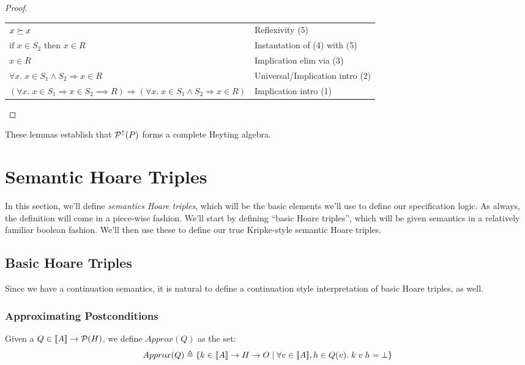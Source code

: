 \begin{proof}
\begin{tabular}{ll}
$x \succeq x$ & 
Reflexivity (5) \\

$\mbox{if } x \in S_2 \mbox{ then } x \in R$ & 
Instantation of (4) with (5) \\

$x \in R$ & 
Implication elim via (3) \\

$\forall x.\; x \in S_1 \land S_2 \Rightarrow x \in R$ & 
Universal/Implication intro (2) \\

$(\forall x.\; x \in S_1 \Rightarrow x \in S_2 \implies R) \Rightarrow (\forall x.\; x \in S_1 \land S_2 \Rightarrow x \in R)$ & 
Implication intro (1) \\
\end{tabular}
\end{proof}

These lemmas establish that $\mathcal{P}^{\uparrow}({P})$ forms a complete Heyting algebra. 

\section{Semantic Hoare Triples}

In this section, we'll define \emph{semantics Hoare triples}, which will be the basic
elements we'll use to define our specification logic. As always, the definition
will come in a piece-wise fashion. We'll start by defining ``basic Hoare triples'',
which will be given semantics in a relatively familiar boolean fashion. We'll then
use these to define our true Kripke-style semantic Hoare triples. 

\subsection{Basic Hoare Triples}

Since we have a continuation semantics, it is natural to define a
continuation style interpretation of basic Hoare triples, as well.

\subsubsection{Approximating Postconditions}

Given a $Q \in [\![{A}]\!] \to \mathcal{P}(H)$, we define $Approx(Q)$ as the set:
\begin{displaymath}
  Approx(Q) \triangleq \{{{k \in [\![{A}]\!] \to H \to O}\;|\;{\forall v \in [\![{A}]\!], h \in Q(v).\; k\;v\;h = \bot}}\}
\end{displaymath}


